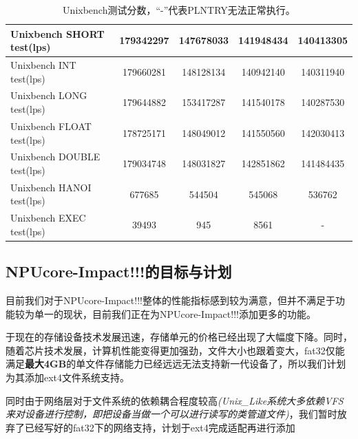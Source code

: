 \begin{table}[H]
{\begin{tabular}{|l|c|c|c|c|}
        \hline
        Unixbench SHORT test(lps)           & 179342297             &147678033      & 141948434             & 140413305 \\
        \hline
        Unixbench INT test(lps)             & 179660281             &148128134      & 140942140             & 140311940 \\
        \hline
        Unixbench LONG test(lps)            & 179644882             &153417287      & 141540178             & 140287530 \\
        \hline
        Unixbench FLOAT test(lps)           & 178725171             &148049012      & 141550560             & 142030413 \\
        \hline
        Unixbench DOUBLE test(lps)          & 179034748             &148031827      & 142851862             & 141484435 \\
        \hline
        Unixbench HANOI test(lps)           & 677685                &544504         & 545068                & 536762    \\
        \hline
        Unixbench EXEC test(lps)            & 39493                 &945            & 8561                  & -         \\
        \hline
    \end{tabular}
    }
    \caption{Unixbench测试分数，“-”代表PLNTRY无法正常执行。}
    \label{Unixbench测试结果}
\end{table}

\subsection{NPUcore-Impact!!!的目标与计划}

目前我们对于NPUcore-Impact!!!整体的性能指标感到较为满意，但并不满足于功能较为单一的现状，目前我们正在为NPUcore-Impact!!!添加更多的功能。

于现在的存储设备技术发展迅速，存储单元的价格已经出现了大幅度下降。同时，随着芯片技术发展，计算机性能变得更加强劲，文件大小也跟着变大，fat32仅能满足\textbf{最大4GB}的单文件存储能力已经远远无法支持新一代设备了，所以我们计划为其添加ext4文件系统支持。

同时由于网络层对于文件系统的依赖耦合程度较高\textit{(Unix_Like系统大多依赖VFS来对设备进行控制，即把设备当做一个可以进行读写的类管道文件)}，我们暂时放弃了已经写好的fat32下的网络支持，计划于ext4完成适配再进行添加